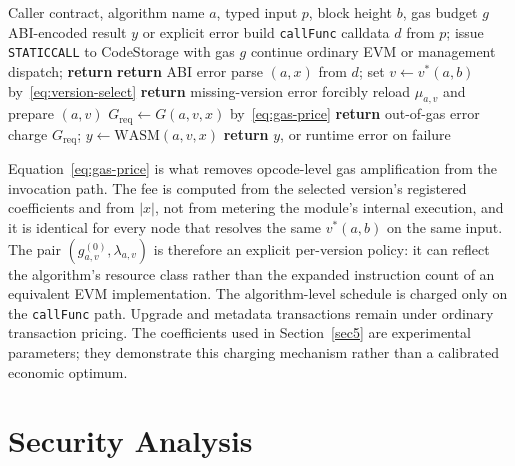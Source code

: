 \documentclass[pdflatex,sn-mathphys-num]{sn-jnl}%
\theoremstyle{thmstyleone}%
\theoremstyle{thmstyletwo}%
\theoremstyle{thmstylethree}%
\begin{document}
\begin{algorithm}[!tb]
\caption{\textbf{Contract-to-coprocessor invocation protocol.}}
\label{alg:invocation-protocol}
\begin{algorithmic}[1]
\Require Caller contract, algorithm name $a$, typed input $p$, block height $b$, gas budget $g$
\Ensure ABI-encoded result $y$ or explicit error
\State build \texttt{callFunc} calldata $d$ from $p$; issue \texttt{STATICCALL} to CodeStorage with gas $g$
    \State continue ordinary EVM or management dispatch; \textbf{return}
\EndIf
{}
    \State \textbf{return} ABI error
\EndIf
\State parse $(a,x)$ from $d$; set $v\gets v^{*}(a,b)$ by~\eqref{eq:version-select}
    \State \textbf{return} missing-version error
\EndIf
{}
    \Repeat
        \State forcibly reload $\mu_{a,v}$ and prepare $(a,v)$
\EndIf
\State $G_{\mathrm{req}}\gets G(a,v,x)$ by~\eqref{eq:gas-price}
    \State \textbf{return} out-of-gas error
\EndIf
\State charge $G_{\mathrm{req}}$; $y\gets\mathrm{WASM}(a,v,x)$
\State \textbf{return} $y$, or runtime error on failure
\end{algorithmic}
\end{algorithm}

Equation~\eqref{eq:gas-price} is what removes opcode-level gas amplification from the invocation path. The fee is computed from the selected version's registered coefficients and from $|x|$, not from metering the module's internal execution, and it is identical for every node that resolves the same $v^{*}(a,b)$ on the same input. The pair $(g^{(0)}_{a,v},\lambda_{a,v})$ is therefore an explicit per-version policy: it can reflect the algorithm's resource class rather than the expanded instruction count of an equivalent EVM implementation. The algorithm-level schedule is charged only on the \texttt{callFunc} path. Upgrade and metadata transactions remain under ordinary transaction pricing. The coefficients used in Section~\ref{sec5} are experimental parameters; they demonstrate this charging mechanism rather than a calibrated economic optimum.

\section{Security Analysis}\label{sec4}
\end{document}
